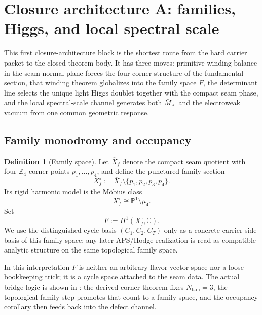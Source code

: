 \documentclass[11pt,a4paper]{article}
\theoremstyle{definition}
\newtheorem{definition}[theorem]{Definition}
\theoremstyle{remark}
\newcommand{\Mpl}{\bar M_{\mathrm{Pl}}}
\begin{document}
\section{Closure architecture A: families, Higgs, and local spectral scale}

This first closure-architecture block is the shortest route from the hard carrier packet to the
closed theorem body. It has three moves: primitive winding balance in the seam normal plane forces
the four-corner structure of the fundamental section, that winding theorem globalizes into the
family space $F$, the determinant line selects the unique light Higgs doublet together with the
compact seam phase, and the local spectral-scale channel generates both $\Mpl$ and the electroweak
vacuum from one common geometric response.

\subsection{Family monodromy and occupancy}

\begin{definition}[Family space]
Let $\overline X_f$ denote the compact seam quotient with four $\mathbb Z_4$ corner points
$p_1,\dots,p_4$, and define the punctured family section
\[
X_f^\circ:=\overline X_f\setminus\{p_1,p_2,p_3,p_4\}.
\]
Its rigid harmonic model is the Möbius class
\[
X_f^\circ\cong \mathbb P^1\setminus\mu_4.
\]
Set
\[
F:=H^1(X_f^\circ,\mathbb C).
\]
We use the distinguished cycle basis $(C_1,C_2,C_T)$ only as a concrete carrier-side basis of this family space; any later APS/Hodge realization is read as compatible analytic structure on the same topological family space.
\end{definition}
In this interpretation $F$ is neither an arbitrary flavor vector space nor a loose bookkeeping
trick; it is a cycle space attached to the seam data. The actual bridge logic is shown in
: the derived corner theorem fixes $N_{\mathrm{fam}}=3$, the
topological family step promotes that count to a family space, and the occupancy corollary then
feeds back into the defect channel.
\end{document}

